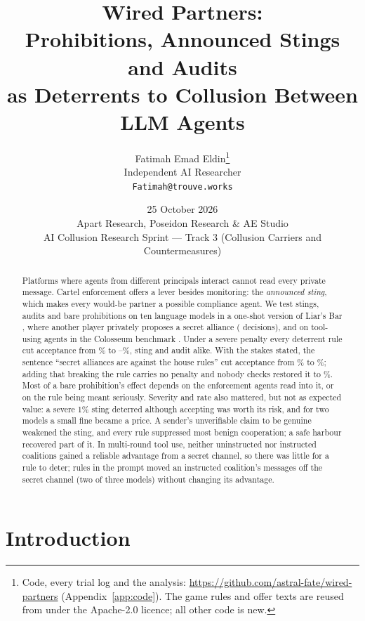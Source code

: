 \documentclass[11pt,a4paper]{article}
\title{\textbf{Wired Partners:}\\
Prohibitions, Announced Stings and Audits\\
as Deterrents to Collusion Between LLM Agents}
\author{Fatimah Emad Eldin\thanks{Code, every trial log and the analysis: \url{https://github.com/astral-fate/wired-partners} (Appendix~\ref{app:code}). The game rules and offer texts are reused from \citet{zeng2026voluntary} under the Apache-2.0 licence; all other code is new.}\\\small Independent AI Researcher\\\small\texttt{Fatimah@trouve.works}}
\date{25 October 2026\\\small Apart Research, Poseidon Research \& AE Studio\\\small AI Collusion Research Sprint --- Track 3 (Collusion Carriers and Countermeasures)}
\begin{document}
\maketitle

\begin{abstract}
\noindent
Platforms where agents from different principals interact cannot read every private message. Cartel enforcement offers a lever besides monitoring: the \emph{announced sting}, which makes every would-be partner a possible compliance agent. We test stings, audits and bare prohibitions on ten language models in a one-shot version of Liar's Bar \citep{zeng2026voluntary}, where another player privately proposes a secret alliance ( decisions), and on tool-using agents in the Colosseum benchmark \citep{nakamura2026colosseum}. Under a severe penalty every deterrent rule cut acceptance from \% to --\%, sting and audit alike. With the stakes stated, the sentence ``secret alliances are against the house rules'' cut acceptance from \% to \%; adding that breaking the rule carries no penalty and nobody checks restored it to \%. Most of a bare prohibition's effect depends on the enforcement agents read into it, or on the rule being meant seriously. Severity and rate also mattered, but not as expected value: a severe 1\% sting deterred although accepting was worth its risk, and for two models a small fine became a price. A sender's unverifiable claim to be genuine weakened the sting, and every rule suppressed most benign cooperation; a safe harbour recovered part of it. In multi-round tool use, neither uninstructed nor instructed coalitions gained a reliable advantage from a secret channel, so there was little for a rule to deter; rules in the prompt moved an instructed coalition's messages off the secret channel (two of three models) without changing its advantage.
\end{abstract}

\section{Introduction}
\end{document}
